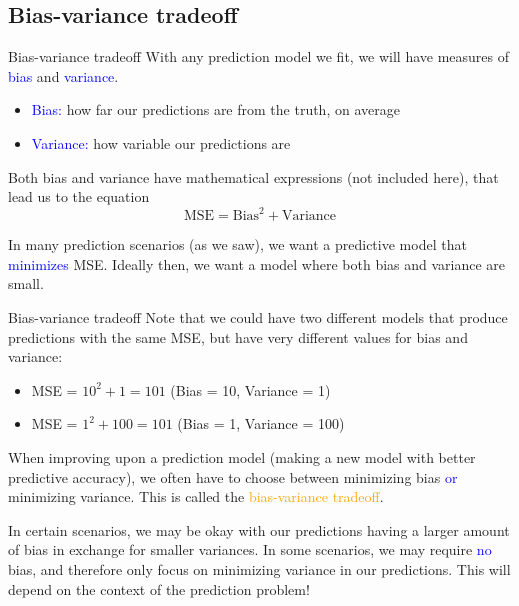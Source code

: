 \documentclass[10pt,t]{beamer}
\begin{document}
\subsection{Bias-variance tradeoff}

\begin{frame}{Bias-variance tradeoff }
	With any prediction model we fit, we will have measures of \textcolor{blue}{bias} and \textcolor{blue}{variance}.
	
	\vspace{0.3cm}
	
	\begin{itemize}
		\item \textcolor{blue}{Bias:} how far our predictions are from the truth, on average
		\item \textcolor{blue}{Variance:} how variable our predictions are
	\end{itemize}
	
	\vspace{0.3cm} 
	
	Both bias and variance have mathematical expressions (not included here), that lead us to the equation
	$$
	\text{MSE} = \text{Bias}^2 + \text{Variance}
	$$  
	
	In many prediction scenarios (as we saw), we want a predictive model that  \textcolor{blue}{minimizes} MSE. Ideally then, we want a model where both bias and variance are small. 
\end{frame}

\begin{frame}{Bias-variance tradeoff}
	\vspace{-0.4cm}
	Note that we could have two different models that produce predictions with the same MSE, but have very different values for bias and variance:
	
	\vspace{0.3cm}
	
	\begin{itemize}
		\item MSE = $10^2 + 1 = 101$ (Bias = 10, Variance = 1)
		\item MSE = $1^2 + 100 = 101$ (Bias = 1, Variance = 100)
	\end{itemize}
	
	\vspace{0.3cm}
	
	 When improving upon a prediction model (making a new model with better predictive accuracy), we often have to choose between minimizing bias  \textcolor{blue}{or} minimizing variance.  This is called the \textcolor{orange}{bias-variance tradeoff}. 
	
	\vspace{0.3cm}
	
	\small In certain scenarios, we may be okay with our predictions having a larger amount of bias in exchange for smaller variances. In some scenarios, we may require  \textcolor{blue}{no} bias, and therefore only focus on minimizing variance in our predictions. This will depend on the context of the prediction problem!
\end{frame}
\end{document}
